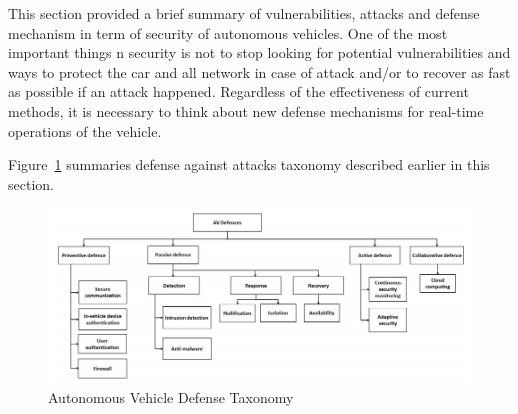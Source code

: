 This section provided a brief summary of vulnerabilities, attacks and defense mechanism in term of security of autonomous vehicles. One of the most important things n security is not to stop looking for potential vulnerabilities and ways to protect the car and all network in case of attack and/or to recover as fast as possible if an attack happened. Regardless of the effectiveness of current methods, it is necessary to think about new defense mechanisms for real-time operations of the vehicle. 	

Figure~\ref{fig:DefenseTaxonomy} summaries defense against attacks taxonomy described earlier in this section.

\begin{figure}[h]
	\centering  	
	\includegraphics[width=15cm]{img/7.jpg}
	\caption{Autonomous Vehicle Defense Taxonomy \cite{sec}}
	\label{fig:DefenseTaxonomy}    
\end{figure}